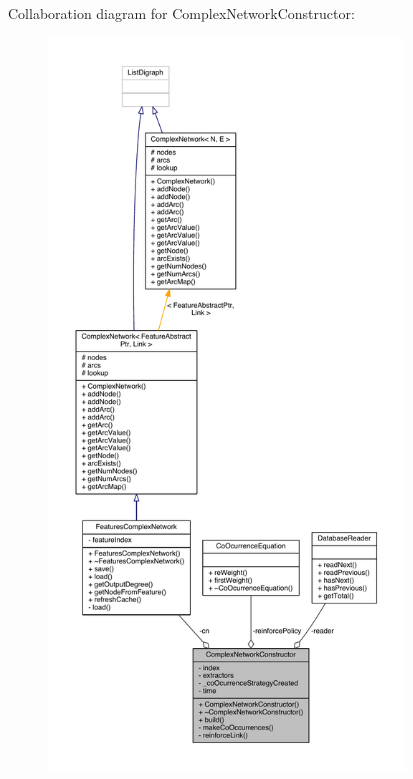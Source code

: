 Collaboration diagram for Complex\+Network\+Constructor\+:
\nopagebreak
\begin{figure}[H]
\begin{center}
\leavevmode
\includegraphics[height=550pt]{class_complex_network_constructor__coll__graph}
\end{center}
\end{figure}


